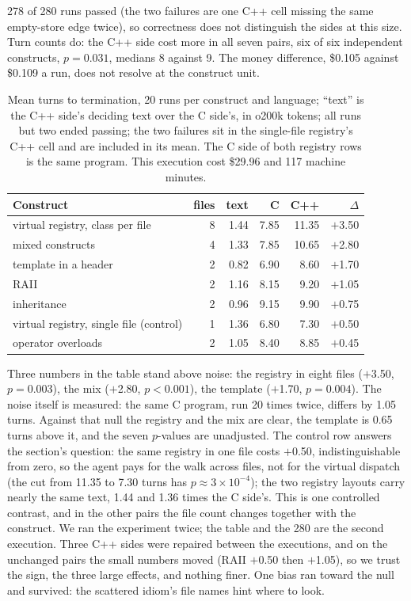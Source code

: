 \documentclass[journal]{IEEEtran}
\begin{document}
278 of 280 runs passed (the two failures are one C++ cell missing the
same empty-store edge twice), so correctness does not distinguish the sides at
this size. Turn counts do: the C++ side cost more in all seven pairs, six of
six independent constructs, $p = 0.031$, medians 8 against 9. The
money difference, \$0.105 against \$0.109 a run, does not resolve at
the construct unit.

\begin{table}[H]
\centering
\footnotesize\setlength{\tabcolsep}{3pt}
\begin{tabular}{@{}lrrrrr@{}}
\toprule
Construct & files & text & C & C++ & $\Delta$ \\
\midrule
virtual registry, class per file & 8 & 1.44 & 7.85 & 11.35 & $+$3.50 \\
mixed constructs & 4 & 1.33 & 7.85 & 10.65 & $+$2.80 \\
template in a header & 2 & 0.82 & 6.90 & 8.60 & $+$1.70 \\
RAII & 2 & 1.16 & 8.15 & 9.20 & $+$1.05 \\
inheritance & 2 & 0.96 & 9.15 & 9.90 & $+$0.75 \\
virtual registry, single file (control) & 1 & 1.36 & 6.80 & 7.30 & $+$0.50 \\
operator overloads & 2 & 1.05 & 8.40 & 8.85 & $+$0.45 \\
\bottomrule
\end{tabular}
\caption{Mean turns to termination, 20 runs per construct and language;
``text'' is the C++ side's deciding text over the C side's, in o200k tokens;
all runs but two ended passing; the two failures sit in the single-file
registry's C++ cell and are included in its mean. The C side of both registry rows is the same
program. This execution cost \$29.96 and 117 machine minutes.}
\label{tab:pairs}
\end{table}

Three numbers in the table stand above noise: the registry in eight
files ($+$3.50, $p = 0.003$), the mix ($+$2.80, $p < 0.001$), the
template ($+$1.70, $p = 0.004$). The noise itself is measured: the same
C program, run 20 times twice, differs by 1.05 turns. Against that
null the registry and the mix are clear, the template is 0.65 turns
above it, and the seven $p$-values are unadjusted. The control row
answers the section's question: the same registry in one file costs
$+$0.50, indistinguishable from zero, so the agent pays for the walk
across files, not for the virtual dispatch (the cut from 11.35 to 7.30
turns has $p \approx 3\times10^{-4}$); the two registry layouts carry
nearly the same text, 1.44 and 1.36 times the C side's. This is one
controlled contrast, and in the other pairs the file count changes
together with the construct. We ran the experiment twice; the table and
the 280 are the second execution.
Three C++ sides were repaired between the executions, and on the
unchanged pairs the small numbers moved (RAII $+$0.50 then $+$1.05), so
we trust the sign, the three large effects, and nothing finer. One bias
ran toward the null and survived: the scattered idiom's file names hint
where to look.
\end{document}
